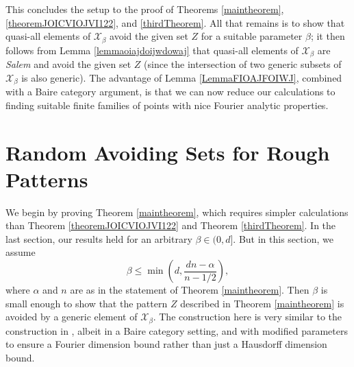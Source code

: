 \documentclass[dvipsnames,letterpaper,12pt]{article}
\numberwithin{equation}{section}
\numberwithin{theorem}{section}
\begin{document}
This concludes the setup to the proof of Theorems \ref{maintheorem}, \ref{theoremJOICVIOJVI122}, and \ref{thirdTheorem}. All that remains is to show that quasi-all elements of $\mathcal{X}_\beta$ avoid the given set $Z$ for a suitable parameter $\beta$; it then follows from Lemma \ref{lemmaoiajdoijwdowaj} that quasi-all elements of $\mathcal{X}_\beta$ are \emph{Salem} and avoid the given set $Z$ (since the intersection of two generic subsets of $\mathcal{X}_\beta$ is also generic). The advantage of Lemma \ref{LemmaFIOAJFOIWJ}, combined with a Baire category argument, is that we can now reduce our calculations to finding suitable finite families of points with nice Fourier analytic properties.

\section{Random Avoiding Sets for Rough Patterns}

We begin by proving Theorem \ref{maintheorem}, which requires simpler calculations than Theorem \ref{theoremJOICVIOJVI122} and Theorem \ref{thirdTheorem}. In the last section, our results held for an arbitrary $\beta \in (0,d]$. But in this section, we assume
%
\[ \beta \leq \min \left( d, \frac{dn - \alpha}{n - 1/2} \right), \]
%
where $\alpha$ and $n$ are as in the statement of Theorem \ref{maintheorem}. Then $\beta$ is small enough to show that the pattern $Z$ described in Theorem \ref{maintheorem} is avoided by a generic element of $\mathcal{X}_\beta$. The construction here is very similar to the construction in \cite{OurPaper}, albeit in a Baire category setting, and with modified parameters to ensure a Fourier dimension bound rather than just a Hausdorff dimension bound.
\end{document}
